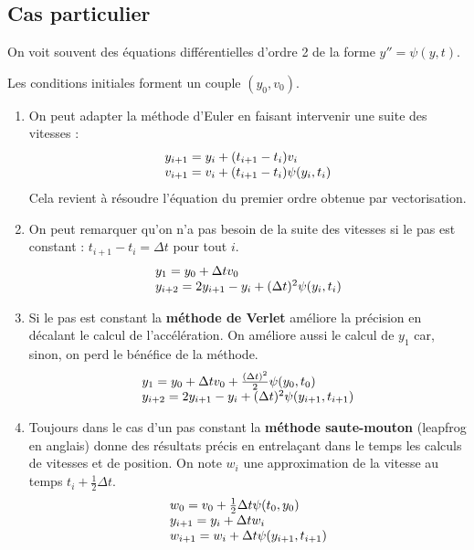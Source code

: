 \subsection{Cas particulier} 
On voit souvent des équations différentielles d'ordre 2 de la forme $y'' = \psi(y, t)$.

Les conditions initiales forment un couple $(y_0, v_0)$.
\begin{enumerate}
 \item On peut adapter la méthode d'Euler en faisant intervenir une suite des vitesses :
 \[\begin{matrix} y_{i+1} = y_i + (t_{i+1}-t_i)v_i\hfill\\ v_{i+1} = v_i + (t_{i+1}-t_i)\psi(y_i, t_i)\hfill\end{matrix}\]
 Cela revient à résoudre l'équation du premier ordre obtenue par vectorisation.
 \item On peut remarquer qu'on n'a pas besoin de la suite des vitesses si le pas est constant : $t_{i+1}-t_i = \Delta t$ pour tout $i$. 
 \[\begin{matrix} y_1 = y_0 + \Delta t v_0\hfill\\ y_{i+2} = 2y_{i+1} -y_i +(\Delta t)^2\psi(y_i, t_i)\hfill\end{matrix}\]
 \item Si le pas est constant la {\bf méthode de Verlet} améliore la précision en décalant le calcul de l'accélération. On améliore aussi le calcul de $y_1$ car, sinon, on perd le bénéfice de la méthode. 
 \[\begin{matrix} y_1 = y_0 + \Delta t v_0+\frac{(\Delta t)^2}{2}\psi(y_0, t_0) \hfill\\ y_{i+2} = 2y_{i+1} -y_i +(\Delta t)^2\psi(y_{i+1}, t_{i+1})\hfill\end{matrix}\]
 \item Toujours dans le cas d'un pas constant la {\bf méthode saute-mouton} (leapfrog en anglais) donne des résultats précis en entrelaçant dans le temps les calculs de vitesses et de position. On note $w_i$ une approximation de la vitesse au temps $t_i + \frac 12 \Delta t$.
 \[\begin{matrix} w_0 = v_0 + \frac12 \Delta t\psi(t_0,y_0)\hfill\\
 y_{i+1} = y_i + \Delta t w_i\hfill\\ w_{i+1} = w_i + \Delta t \psi(y_{i+1}, t_{i+1})\hfill\\\end{matrix}\]
\end{enumerate}
